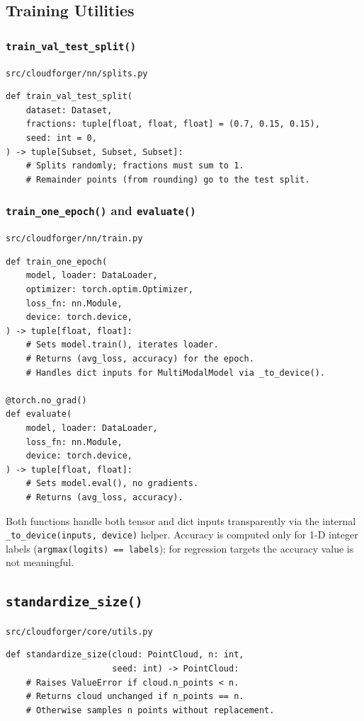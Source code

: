 \documentclass[11pt, a4paper]{article}
\newcommand{\code}[1]{\texttt{#1}}
\newcommand{\pyfile}[1]{\texttt{\small #1}}
\begin{document}
\subsection{Training Utilities}

\subsubsection{\code{train\_val\_test\_split()}}
\pyfile{src/cloudforger/nn/splits.py}

\begin{lstlisting}
def train_val_test_split(
    dataset: Dataset,
    fractions: tuple[float, float, float] = (0.7, 0.15, 0.15),
    seed: int = 0,
) -> tuple[Subset, Subset, Subset]:
    # Splits randomly; fractions must sum to 1.
    # Remainder points (from rounding) go to the test split.
\end{lstlisting}

\subsubsection{\code{train\_one\_epoch()} and \code{evaluate()}}
\pyfile{src/cloudforger/nn/train.py}

\begin{lstlisting}
def train_one_epoch(
    model, loader: DataLoader,
    optimizer: torch.optim.Optimizer,
    loss_fn: nn.Module,
    device: torch.device,
) -> tuple[float, float]:
    # Sets model.train(), iterates loader.
    # Returns (avg_loss, accuracy) for the epoch.
    # Handles dict inputs for MultiModalModel via _to_device().

@torch.no_grad()
def evaluate(
    model, loader: DataLoader,
    loss_fn: nn.Module,
    device: torch.device,
) -> tuple[float, float]:
    # Sets model.eval(), no gradients.
    # Returns (avg_loss, accuracy).
\end{lstlisting}

Both functions handle both tensor and dict inputs transparently
via the internal \code{\_to\_device(inputs, device)} helper.
Accuracy is computed only for 1-D integer labels
(\code{argmax(logits) == labels}); for regression targets the
accuracy value is not meaningful.

\subsection{\code{standardize\_size()}}
\pyfile{src/cloudforger/core/utils.py}

\begin{lstlisting}
def standardize_size(cloud: PointCloud, n: int,
                     seed: int) -> PointCloud:
    # Raises ValueError if cloud.n_points < n.
    # Returns cloud unchanged if n_points == n.
    # Otherwise samples n points without replacement.
\end{lstlisting}
\end{document}
